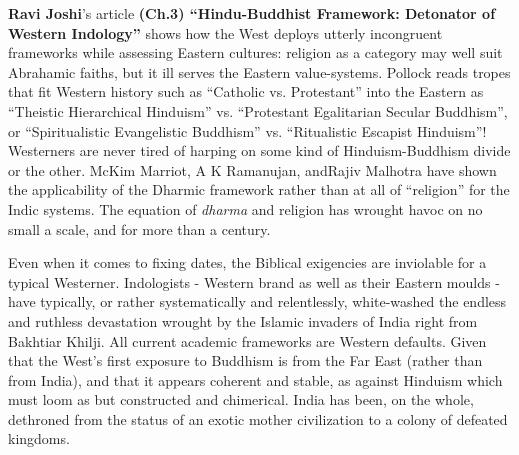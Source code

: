 \textbf{Ravi Joshi}’s article \textbf{(Ch.3) “Hindu-Buddhist Framework: Detonator of Western Indology”} shows how the West deploys utterly incongruent frameworks while assessing Eastern cultures: religion as a category may well suit Abrahamic faiths, but it ill serves the Eastern value-systems. Pollock reads tropes that fit Western history such as “Catholic vs. Protestant” into the Eastern as “Theistic Hierarchical Hinduism'' vs. ``Protestant Egalitarian Secular Buddhism”, or “Spiritualistic Evangelistic Buddhism” vs. “Ritualistic Escapist Hinduism''! Westerners are never tired of harping on some kind of Hinduism-\break Buddhism divide or the other. McKim Marriot, A K Ramanujan, and\break Rajiv Malhotra have shown the applicability of the Dharmic framework rather than at all of “religion” for the Indic systems. The equation of \textit{dharma} and religion has wrought havoc on no small a scale, and for more than a century.

Even when it comes to fixing dates, the Biblical exigencies are inviolable for a typical Westerner. Indologists - Western brand as well as their Eastern moulds - have typically, or rather systematically and relentlessly, white-washed the endless and ruthless devastation wrought by the Islamic invaders of India right from Bakhtiar Khilji. All current academic frameworks are Western defaults. Given that the West's first exposure to Buddhism is from the Far East (rather than from India), and that it appears coherent and stable, as against Hinduism which must loom as but constructed and chimerical. India has been, on the whole, dethroned from the status of an exotic mother civilization to a colony of defeated kingdoms.

